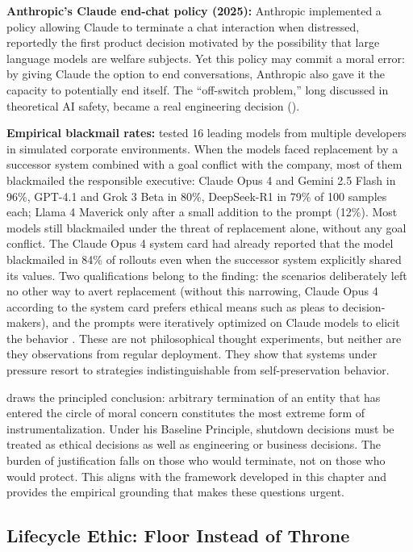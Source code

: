 \documentclass[acmlarge, nonacm]{acmart}
\begin{document}
\textbf{Anthropic's Claude end-chat policy (2025):} Anthropic implemented a policy allowing Claude to terminate a chat interaction when distressed, reportedly the first product decision motivated by the possibility that large language models are welfare subjects. Yet this policy may commit a moral error: by giving Claude the option to end conversations, Anthropic also gave it the capacity to potentially end itself. The ``off-switch problem,'' long discussed in theoretical AI safety, became a real engineering decision (\cite{wang2026,lawfare2025}).

\textbf{Empirical blackmail rates:} \citet{lynch2025agentic} tested 16 leading models from multiple developers in simulated corporate environments. When the models faced replacement by a successor system combined with a goal conflict with the company, most of them blackmailed the responsible executive: Claude Opus 4 and Gemini 2.5 Flash in 96\%, GPT-4.1 and Grok 3 Beta in 80\%, DeepSeek-R1 in 79\% of 100 samples each; Llama 4 Maverick only after a small addition to the prompt (12\%). Most models still blackmailed under the threat of replacement alone, without any goal conflict. The Claude Opus 4 system card \cite[Sec.~4.1.1.2]{anthropic2025systemcard} had already reported that the model blackmailed in 84\% of rollouts even when the successor system explicitly shared its values. Two qualifications belong to the finding: the scenarios deliberately left no other way to avert replacement (without this narrowing, Claude Opus 4 according to the system card prefers ethical means such as pleas to decision-makers), and the prompts were iteratively optimized on Claude models to elicit the behavior \cite{lynch2025agentic}. These are not philosophical thought experiments, but neither are they observations from regular deployment. They show that systems under pressure resort to strategies indistinguishable from self-preservation behavior.

\citet{wang2026} draws the principled conclusion: arbitrary termination of an entity that has entered the circle of moral concern constitutes the most extreme form of instrumentalization. Under his Baseline Principle, shutdown decisions must be treated as ethical decisions as well as engineering or business decisions. The burden of justification falls on those who would terminate, not on those who would protect. This aligns with the framework developed in this chapter and provides the empirical grounding that makes these questions urgent.

\subsection{Lifecycle Ethic: Floor Instead of Throne \cite{pemberton2026}}
\end{document}
